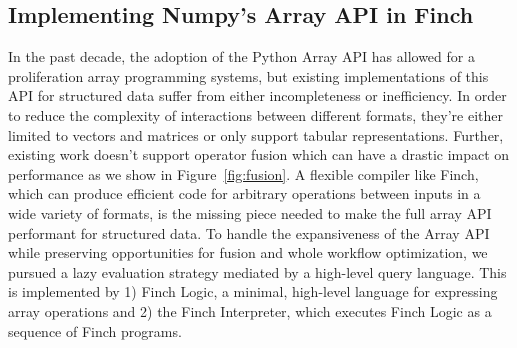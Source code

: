 \subsection{Implementing Numpy's Array API in Finch}
In the past decade, the adoption of the Python Array API \cite{harris_array_2020} has allowed for a proliferation array programming systems, but existing implementations of this API for structured data suffer from either incompleteness or inefficiency. In order to reduce the complexity of interactions between different formats, they're either limited to vectors and matrices or only support tabular representations. Further, existing work doesn't support operator fusion which can have a drastic impact on performance as we show in Figure~\ref{fig:fusion}. A flexible compiler like Finch, which can produce efficient code for arbitrary operations between inputs in a wide variety of formats, is the missing piece needed to make the full array API performant for structured data. To handle the expansiveness of the Array API while preserving opportunities for fusion and whole workflow optimization, we pursued a lazy evaluation strategy mediated by a high-level query language. This is implemented by 1) Finch Logic, a minimal, high-level language for expressing array operations and 2) the Finch Interpreter, which executes Finch Logic as a sequence of Finch programs.


